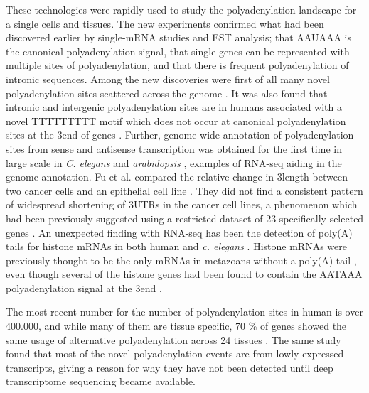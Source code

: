 These technologies were rapidly used to study the polyadenylation landscape for
a single cells and tissues. The new experiments confirmed what had been
discovered earlier by single-mRNA studies and EST analysis; that AAUAAA is the
canonical polyadenylation signal, that single genes can be represented with
multiple sites of polyadenylation, and that there is frequent polyadenylation
of intronic sequences. Among the new discoveries were first of all many novel
polyadenylation sites scattered across the genome
\cite{ozsolak_comprehensive_2010, derti_quantitative_2012}. It was also found
that intronic and intergenic polyadenylation sites are in humans associated
with a novel TTTTTTTTT motif which does not occur at canonical polyadenylation
sites at the 3\p end of genes \cite{ozsolak_comprehensive_2010}. Further,
genome wide annotation of polyadenylation sites from sense and antisense
transcription was obtained for the first time in large scale in \textit{C.
elegans} and \textit{arabidopsis} \cite{mangone_landscape_2010,
wu_genome-wide_2011}, examples of RNA-seq aiding in the genome annotation. Fu
et al. compared the relative change in 3\p length between two cancer cells and
an epithelial cell line \cite{fu_differential_2011}. They did not find a
consistent pattern of widespread shortening of 3\p UTRs in the cancer cell
lines, a phenomenon which had been previously suggested using a restricted
dataset of 23 specifically selected genes \cite{mayr_widespread_2009-2}. An
unexpected finding with RNA-seq has been the detection of poly(A) tails for
histone mRNAs in both human and \textit{c. elegans}
\cite{mangone_landscape_2010-1, shepard_complex_2011}. Histone mRNAs were
previously thought to be the only mRNAs in metazoans without a poly(A) tail
\cite{marzluff_metabolism_2008}, even though several of the histone genes had
been found to contain the AATAAA polyadenylation signal at the 3\p end
\cite{keall_histone_2007}.

The most recent number for the number of polyadenylation sites in human is over
400.000, and while many of them are tissue specific, 70 \% of genes showed the
same usage of alternative polyadenylation across 24 tissues
\cite{derti_quantitative_2012}. The same study found that most of the novel
polyadenylation events are from lowly expressed transcripts, giving a reason
for why they have not been detected until deep transcriptome sequencing became
available. 




